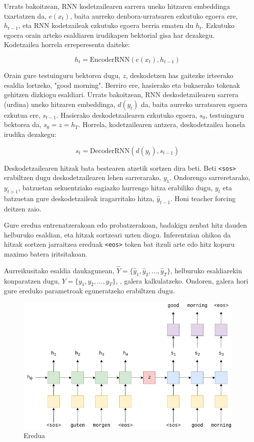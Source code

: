 \documentclass[11pt,a4paper]{article}
\begin{document}
Urrats bakoitzean, RNN kodetzailearen sarrera uneko hitzaren embeddinga txartatzen da, $e(x_t)$, baita aurreko denbora-urratsaren ezkutuko egoera ere, $h_{t-1}$, eta RNN kodetzaileak ezkutuko egoera berria ematen du $h_t$. Ezkutuko egoera orain arteko esaldiaren irudikapen bektorial gisa har dezakegu. Kodetzailea horrela erreperesenta daiteke:

$$h_t = \text{EncoderRNN}(e(x_t), h_{t-1})$$

Orain gure testuinguru bektorea dugu, $z$, deskodetzen has gaitezke irteerako esaldia lortzeko, "good morning". Berriro ere, hasierako eta bukaerako tokenak gehitzen dizkiogu esaldiari. Urrats bakoitzean, RNN deskodetzailearen sarrera (urdina) uneko hitzaren embeddinga, $d(y_t)$ da, baita aurreko urratsaren egoera ezkutua ere, $s_{t-1}$. Hasierako deskodetzailearen ezkutuko egoera, $s_0$, testuinguru bektorea da, $s_0 = z = h_T$. Horrela, kodetzailearen antzera, deskodetzailea honela irudika dezakegu:

$$s_t = \text{DecoderRNN}(d(y_t), s_{t-1})$$

Deskodetzailearen hitzak bata bestearen atzetik sortzen dira beti. Beti \texttt{<sos>} erabiltzen dugu deskodetzailearen lehen sarrerarako, $y_1$. Ondorengo sarreretarako, $y_{t>1}$, batzuetan sekuentziako eagiazko hurrengo hitza erabiliko dugu, $y_t$ eta batzuetan gure deskodetzaileak iragarritako hitza, $\hat{y}_{t-1}$. Honi teacher forcing deitzen zaio.

Gure eredua entrenatzerakoan edo probatzerakoan, badakigu zenbat hitz dauden helburuko esaldian, eta hitzak sortzeari uzten diogu. Inferentzian ohikoa da hitzak sortzen jarraitzea ereduak \texttt{<eos>} token bat itzuli arte edo hitz kopuru maximo batera iritsitakoan.

Aurreikusitako esaldia daukagunean, $\hat{Y} = \{ \hat{y}_1, \hat{y}_2, ..., \hat{y}_T \}$, helburuko esaldiarekin konparatzen dugu, $Y = \{ y_1, y_2, ..., y_T \}$, , galera kalkulatzeko. Ondoren, galera hori gure ereduko parametroak eguneratzeko erabiltzen dugu.

\begin{figure}[ht]
    \centering
    \includegraphics[width=\linewidth]{seq2seq}
    \caption{Eredua}
    \label{fig:seq2seq}
\end{figure}
\end{document}
